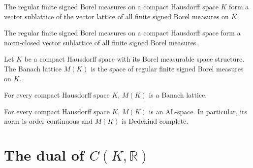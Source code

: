 \begin{definition}
\label{def:regularSignedMeasureSublattice}
\leanok
{}
The regular finite signed Borel measures on a compact Hausdorff
space $K$ form a vector sublattice of the vector lattice of all
finite signed Borel measures on $K$.
\end{definition}

\begin{lemma}
\label{lem:signedMeasure-regular-closed}
\leanok
{}
The regular finite signed Borel measures on a compact Hausdorff
space form a norm-closed vector sublattice of all finite signed
Borel measures.
\end{lemma}

\begin{definition}
\label{def:mofK}
\leanok
{}
Let $K$ be a compact Hausdorff space with its Borel measurable
space structure. The Banach lattice $M(K)$ is the space of regular
finite signed Borel measures on $K$.
\end{definition}

\begin{theorem}
\label{thm:mofK-banachLattice}
\leanok
{}
For every compact Hausdorff space $K$, $M(K)$ is a Banach lattice.
\end{theorem}

\begin{theorem}
\label{thm:mofK-alSpace}
\leanok
{}
For every compact Hausdorff space $K$, $M(K)$ is an AL-space. In
particular, its norm is order continuous and $M(K)$ is Dedekind
complete.
\end{theorem}

\section{The dual of \(C(K,\mathbb{R})\)}

